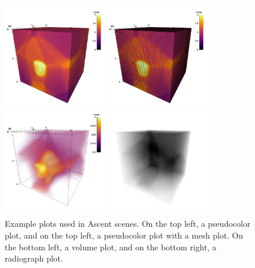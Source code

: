 \begin{figure}
\centering
  \includegraphics[width=0.4\textwidth]{images/pseudocolor250}
  \includegraphics[width=0.4\textwidth]{images/mesh250}
  \includegraphics[width=0.4\textwidth]{images/volume250}
  \includegraphics[width=0.4\textwidth]{images/radiograph250}
  \caption{\label{fig:ascent_plots} Example plots used in Ascent scenes.
%
On the top left, a pseudocolor plot, and
on the top left, a pseudocolor plot with a mesh plot.
%
On the bottom left, a volume plot, and
on the bottom right, a radiograph plot.
  }
\end{figure}

